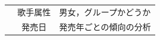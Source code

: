 \begin{table}[tb]
\begin{tabular}{c|c|l}
                                         & 歌手属性 & 男女，グループかどうか                                            \\
                                         & 発売日        & 発売年ごとの傾向の分析                                            \\ \hline
    \end{tabular}

\end{table}

